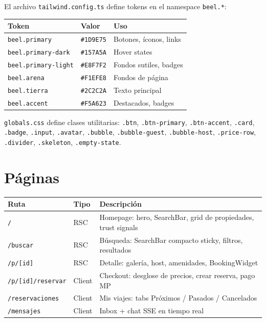 \documentclass[12pt,a4paper]{report}
\begin{document}
El archivo \texttt{tailwind.config.ts} define tokens en el namespace \texttt{beel.*}:

\begin{center}
\begin{tabular}{L{4.5cm} L{2.5cm} L{4.5cm}}
\toprule
\textbf{Token} & \textbf{Valor} & \textbf{Uso} \\
\midrule
\texttt{beel.primary} & \texttt{\#1D9E75} & Botones, \'iconos, links \\
\texttt{beel.primary-dark} & \texttt{\#157A5A} & Hover states \\
\texttt{beel.primary-light} & \texttt{\#E8F7F2} & Fondos sutiles, badges \\
\texttt{beel.arena} & \texttt{\#F1EFE8} & Fondos de p\'agina \\
\texttt{beel.tierra} & \texttt{\#2C2C2A} & Texto principal \\
\texttt{beel.accent} & \texttt{\#F5A623} & Destacados, badges \\
\bottomrule
\end{tabular}
\end{center}

\texttt{globals.css} define clases utilitarias: \texttt{.btn}, \texttt{.btn-primary},
\texttt{.btn-accent}, \texttt{.card}, \texttt{.badge}, \texttt{.input},
\texttt{.avatar}, \texttt{.bubble}, \texttt{.bubble-guest}, \texttt{.bubble-host},
\texttt{.price-row}, \texttt{.divider}, \texttt{.skeleton}, \texttt{.empty-state}.

\section{P\'aginas}

\begin{center}
\begin{tabularx}{\textwidth}{L{5cm} C{1.8cm} X}
\toprule
\textbf{Ruta} & \textbf{Tipo} & \textbf{Descripci\'on} \\
\midrule
\texttt{/} & RSC & Homepage: hero, SearchBar, grid de propiedades, trust signals \\
\texttt{/buscar} & RSC & B\'usqueda: SearchBar compacto sticky, filtros, resultados \\
\texttt{/p/[id]} & RSC & Detalle: galería, host, amenidades, BookingWidget \\
\texttt{/p/[id]/reservar} & Client & Checkout: desglose de precios, crear reserva, pago MP \\
\texttt{/reservaciones} & Client & Mis viajes: tabs Pr\'oximos / Pasados / Cancelados \\
\texttt{/mensajes} & Client & Inbox + chat SSE en tiempo real \\
\bottomrule
\end{tabularx}
\end{center}
\end{document}
